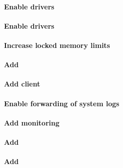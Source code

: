 \documentclass[letterpaper]{article}
\begin{document}
\paragraph{Enable \InfiniBand{} drivers}


\paragraph{Enable \OmniPath{} drivers}



\paragraph{Increase locked memory limits}


\clearpage
\paragraph{Add \beegfs{}} \label{sec:add_beegfs}


\paragraph{Add \Lustre{} client} \label{sec:lustre_client}




\paragraph{Enable forwarding of system logs} \label{sec:add_syslog}


\paragraph{Add \Nagios{} monitoring} \label{sec:add_nagios}


\clearpage
\paragraph{Add \clustershell{}}


\paragraph{Add \genders{}}

\end{document}
